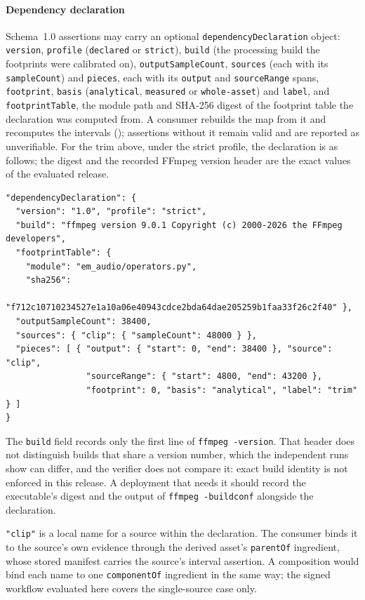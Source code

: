 \documentclass[11pt]{article}
\begin{document}
\paragraph{Dependency declaration} Schema~1.0 assertions may carry an optional
\texttt{dependencyDeclaration} object: \texttt{version}, \texttt{profile}
(\texttt{declared} or \texttt{strict}), \texttt{build} (the processing build the
footprints were calibrated on), \texttt{outputSampleCount}, \texttt{sources}
(each with its \texttt{sampleCount}) and \texttt{pieces}, each with its
\texttt{output} and \texttt{sourceRange} spans, \texttt{footprint},
\texttt{basis} (\texttt{analytical}, \texttt{measured} or
\texttt{whole-asset}) and \texttt{label}, and \texttt{footprintTable}, the
module path and SHA-256 digest of the footprint table the declaration was
computed from. A consumer rebuilds the map from it and
recomputes the intervals (); assertions without it
remain valid and are reported as unverifiable.
For the trim above, under the strict profile, the declaration is as follows; the
digest and the recorded FFmpeg version header are the exact values of the
evaluated release.

\begingroup\footnotesize
\begin{verbatim}
"dependencyDeclaration": {
  "version": "1.0", "profile": "strict",
  "build": "ffmpeg version 9.0.1 Copyright (c) 2000-2026 the FFmpeg developers",
  "footprintTable": {
    "module": "em_audio/operators.py",
    "sha256":
      "f712c10710234527e1a10a06e40943cdce2bda64dae205259b1faa33f26c2f40" },
  "outputSampleCount": 38400,
  "sources": { "clip": { "sampleCount": 48000 } },
  "pieces": [ { "output": { "start": 0, "end": 38400 }, "source": "clip",
                "sourceRange": { "start": 4800, "end": 43200 },
                "footprint": 0, "basis": "analytical", "label": "trim" } ]
}
\end{verbatim}
\endgroup

The \texttt{build} field records only the first line of \texttt{ffmpeg
-version}. That header does not distinguish builds that share a version number,
which the independent runs show can differ, and the verifier does not compare
it: exact build identity is not enforced in this release. A deployment that
needs it should record the executable's digest and the output of
\texttt{ffmpeg -buildconf} alongside the declaration.

\texttt{"clip"} is a local name for a source within the declaration. The
consumer binds it to the source's own evidence through the derived asset's
\texttt{parentOf} ingredient, whose stored manifest carries the source's
interval assertion. A composition would bind each name to one
\texttt{componentOf} ingredient in the same way; the signed workflow evaluated
here covers the single-source case only.
\end{document}
